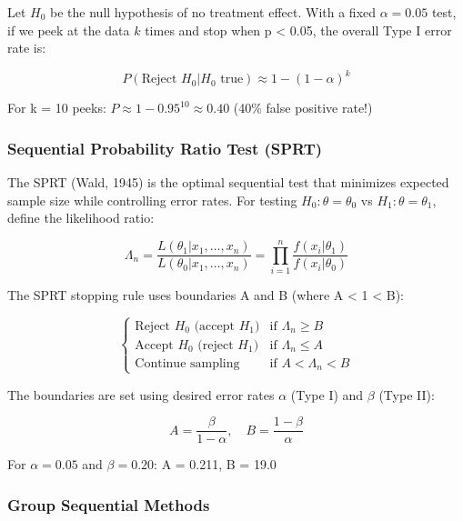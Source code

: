Let $H_0$ be the null hypothesis of no treatment effect. With a fixed $\alpha = 0.05$ test, if we peek at the data $k$ times and stop when p < 0.05, the overall Type I error rate is:

\begin{equation}
P(\text{Reject } H_0 | H_0 \text{ true}) \approx 1 - (1 - \alpha)^k
\end{equation}

For k = 10 peeks: $P \approx 1 - 0.95^{10} \approx 0.40$ (40\% false positive rate!)

\subsubsection{Sequential Probability Ratio Test (SPRT)}

The SPRT (Wald, 1945) is the optimal sequential test that minimizes expected sample size while controlling error rates. For testing $H_0: \theta = \theta_0$ vs $H_1: \theta = \theta_1$, define the likelihood ratio:

\begin{equation}
\Lambda_n = \frac{L(\theta_1 | x_1, \ldots, x_n)}{L(\theta_0 | x_1, \ldots, x_n)} = \prod_{i=1}^{n} \frac{f(x_i | \theta_1)}{f(x_i | \theta_0)}
\end{equation}

The SPRT stopping rule uses boundaries A and B (where A < 1 < B):

\begin{equation}
\begin{cases}
\text{Reject } H_0 \text{ (accept } H_1\text{)} & \text{if } \Lambda_n \geq B \\
\text{Accept } H_0 \text{ (reject } H_1\text{)} & \text{if } \Lambda_n \leq A \\
\text{Continue sampling} & \text{if } A < \Lambda_n < B
\end{cases}
\end{equation}

The boundaries are set using desired error rates $\alpha$ (Type I) and $\beta$ (Type II):

\begin{equation}
A = \frac{\beta}{1 - \alpha}, \quad B = \frac{1 - \beta}{\alpha}
\end{equation}

For $\alpha = 0.05$ and $\beta = 0.20$: A = 0.211, B = 19.0

\subsubsection{Group Sequential Methods}

